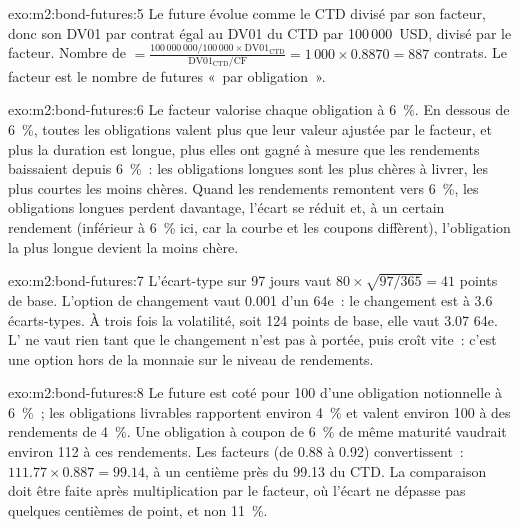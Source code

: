 \begin{solution}{exo:m2:bond-futures:5}
Le future évolue comme le CTD divisé par son facteur, donc son DV01 par contrat
égal au DV01 du CTD par 100\,000~USD, divisé par le facteur. Nombre de
$= \frac{100\,000\,000/100\,000 \times \mathrm{DV01}_{\text{CTD}}}{\mathrm{DV01}_{\text{CTD}}/\mathrm{CF}} = 1\,000 \times 0.8870 = 887$
contrats. Le facteur est le nombre de futures «~par obligation~».
\end{solution}

\begin{solution}{exo:m2:bond-futures:6}
Le facteur valorise chaque obligation à 6~\%. En dessous de 6~\%, toutes les obligations valent plus que
leur valeur ajustée par le facteur, et plus la duration est longue, plus elles ont
gagné à mesure que les rendements baissaient depuis 6~\%~: les obligations longues sont les plus chères à livrer, les
plus courtes les moins chères. Quand les rendements remontent vers 6~\%, les obligations longues perdent davantage,
l'écart se réduit et, à un certain rendement (inférieur à 6~\% ici, car la courbe et les
coupons diffèrent), l'obligation la plus longue devient la moins chère.
\end{solution}

\begin{solution}{exo:m2:bond-futures:7}
L'écart-type sur 97 jours vaut $80 \times \sqrt{97/365} = 41$ points de base.
L'option de changement vaut 0.001 d'un 64e~: le changement est à 3.6
écarts-types. À trois fois la volatilité, soit 124 points de base, elle vaut
3.07 64e. L' ne vaut rien tant que le changement n'est pas à portée,
puis croît vite~: c'est une option hors de la monnaie sur le niveau de
rendements.
\end{solution}

\begin{solution}{exo:m2:bond-futures:8}
Le future est coté pour 100 d'une obligation notionnelle à 6~\%~; les obligations livrables rapportent
environ 4~\% et valent environ 100 à des rendements de 4~\%. Une obligation à coupon de 6~\% de même
maturité vaudrait environ 112 à ces rendements. Les facteurs (de 0.88 à 0.92)
convertissent~: $111.77 \times 0.887 = 99.14$, à un centième près du 99.13 du CTD. La comparaison doit être
faite après multiplication par le facteur, où l'écart ne dépasse pas quelques centièmes
de point, et non 11~\%.
\end{solution}

